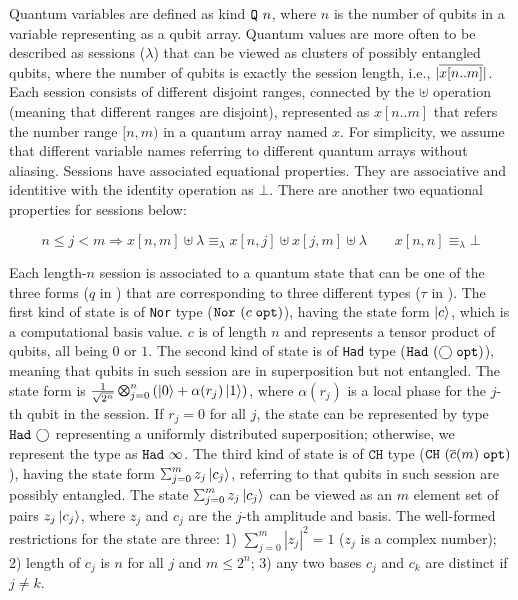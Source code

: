 Quantum variables are defined as kind $\texttt{Q}~n$, where $n$ is the number of qubits in a variable representing as a qubit array. Quantum values are more often to be described as sessions ($\lambda$) that can be viewed as clusters of possibly entangled qubits, where the number of qubits is exactly the session length, i.e., $|\overline{x[n..m]}|$.
Each session consists of different disjoint ranges, connected by the $\uplus$ operation (meaning that different ranges are disjoint), represented as $x[n..m]$ that refers the number range $[n,m)$ in a quantum array named $x$. For simplicity, we assume that different variable names referring to different quantum arrays without aliasing. Sessions have associated equational properties. They are associative and identitive with the identity operation as $\bot$. There are another two equational properties for sessions below:

{\small
\[n \le j < m \Rightarrow x[n,m]\uplus\lambda \equiv_{\lambda} x[n,j]\uplus x[j,m] \uplus\lambda
\qquad 
x[n,n] \equiv_{\lambda} \bot
\]
}

Each length-$n$ session is associated to a quantum state that can be one of the three forms ($q$ in ) that are corresponding to three different types ($\tau$ in ). The first kind of state is of \texttt{Nor} type ($\texttt{Nor}~{(c\;\texttt{opt})}$), having the state form $\left\vert{c}\right\rangle$, which is a computational basis value. $c$ is of length $n$ and represents a tensor product of qubits, all being $0$ or $1$. The second kind of state is of \texttt{Had} type ($\texttt{Had}~{(\bigcirc\;\texttt{opt})}$),  meaning that qubits in such session are in superposition but not entangled.
The state form is $\shad{2^n}{n}{\alpha(r_j)}$, where $\alpha(r_j)$ is a local phase for the $j$-th qubit in the session. If $r_j=0$ for all $j$, the state can be represented by  type $\texttt{Had}~{\bigcirc}$ representing a uniformly distributed superposition; otherwise, we represent the type as $\texttt{Had}~{\infty}$. The third kind of state is of $\texttt{CH}$ type ($\texttt{CH}~{(\overline{c}(m)\;\texttt{opt})}$), having the state form $\sch{m}{z_j}{c_j}$, referring to that qubits in such session are possibly entangled. The state $\sch{m}{z_j}{c_j}$ can be viewed as an $m$ element set of pairs $z_j\left\vert{c_j}\right\rangle$, where $z_j$ and $c_j$ are the $j$-th amplitude and basis.
The well-formed restrictions for the state are three: 1) $\sum_{j=0}^{m}|z_j|^2=1$ ($z_j$ is a complex number); 2) length of $c_j$ is $n$ for all $j$ and $m \le 2^n$; 3) any two bases $c_j$ and $c_k$ are distinct if $j \neq k$.

